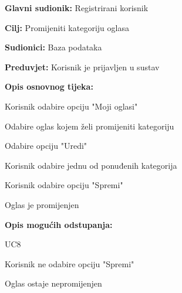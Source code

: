 \noindent {}
\begin{packed_item}
	
	\item \textbf{Glavni sudionik: }Registrirani korisnik
	\item  \textbf{Cilj:} Promijeniti kategoriju oglasa
	\item  \textbf{Sudionici:} Baza podataka
	\item  \textbf{Preduvjet:} Korisnik je prijavljen u sustav
	\item  \textbf{Opis osnovnog tijeka:}
	
	\item[] \begin{packed_enum}
		
		\item Korisnik odabire opciju "Moji oglasi"
		\item Odabire oglas kojem želi promijeniti kategoriju
		\item Odabire opciju "Uredi"
		\item Korisnik odabire jednu od ponuđenih kategorija
		\item Korisnik odabire opciju "Spremi"
		\item Oglas je promijenjen
	\end{packed_enum}
	
	\item  \textbf{Opis mogućih odstupanja:}
	
	\item[] \begin{packed_item}
		
		\item[2.a] UC8
		
		\item[5.a] Korisnik ne odabire opciju "Spremi"
		\item[] \begin{packed_enum}
			
			\item Oglas ostaje nepromijenjen
			
		\end{packed_enum}
		
	\end{packed_item}
\end{packed_item}

